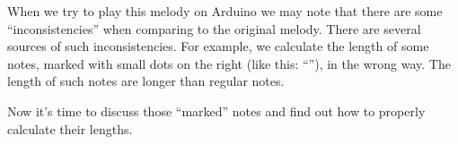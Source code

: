 \documentclass[../sparc.tex]{subfiles}
\begin{document}
When we try to play this melody on Arduino we may note that there are some
``inconsistencies'' when comparing to the original melody.  There are several
sources of such inconsistencies.  For example, we calculate the length of some
notes, marked with small dots on the right (like this: ``\eighthNoteDotted''),
in the wrong way.  The length of such notes are longer than regular notes.

Now it's time to discuss those ``marked'' notes and find out how to properly
calculate their lengths.
\end{document}
